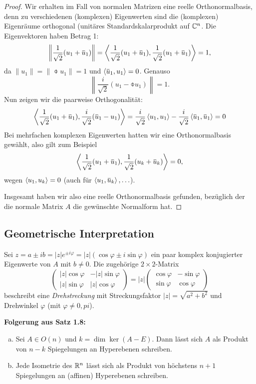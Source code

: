 \begin{proof}
 Wir erhalten im Fall von normalen Matrizen eine reelle Orthonormalbasis, denn zu verschiedenen (komplexen) Eigenwerten sind die (komplexen) Eigenräume orthogonal (uni\-täres Standardskalarprodukt auf $\mathbb{C}^n$. Die Eigenvektoren haben Betrag 1:
 \[ \left\| \rez{\sqrt{2}} ( u_1 + \obar{u}_1 ) \right\| = \scalar{\rez{\sqrt{2}} ( u_1 + \obar{u}_1 ), \rez{\sqrt{2}} ( u_1 + \obar{u}_1 )} = 1, \]
 da $\| u_1 \| = \| \obar{u}_1 \| = 1$ und $\scalar{\obar{u}_1, u_1} = 0$. Genauso
 \[ \left\| \frac{i}{\sqrt{2}} ( u_1 - \obar{u}_1 ) \right\| = 1. \]
 Nun zeigen wir die paarweise Orthogonalität:
 \[ \scalar{\rez{\sqrt{2}} (u_1 + \obar{u}_1), \frac{i}{\sqrt{2}} (\obar{u}_1 - u_1)} = \frac{i}{\sqrt{2}} \scalar{u_1, u_1} - \frac{i}{\sqrt{2}} \scalar{\obar{u}_1, \obar{u}_1} = 0 \]
 Bei mehrfachen komplexen Eigenwerten hatten wir eine Orthonormalbasis gewählt, also gilt zum Beispiel
 \[ \scalar{\rez{\sqrt{2}} ( u_1 + \obar{u}_1 ), \rez{\sqrt{2}} ( u_k + \obar{u}_k )} = 0, \]
 wegen $\left\langle u_1, u_k \right\rangle = 0$ (auch für $\scalar{u_1, \obar{u}_k}, \ldots$).
 
 Insgesamt haben wir also eine reelle Orthonormalbasis gefunden, bezüglich der die normale Matrix $A$ die gewünschte Normalform hat.
\end{proof}

\subsection{Geometrische Interpretation}
Sei $z = a \pm ib = |z| e^{\pm i \varphi} = |z| ( \cos \varphi \pm i \sin \varphi)$ ein paar komplex konjugierter Eigenwerte von $A$ mit $b \ne 0$. Die zugehörige $2 \times 2$-Matrix
\[ \begin{pmatrix} |z| \cos \varphi & - |z| \sin \varphi \\ |z| \sin \varphi & |z| \cos \varphi \end{pmatrix}
   = |z| \begin{pmatrix} \cos \varphi & - \sin \varphi \\ \sin \varphi & \cos \varphi \end{pmatrix} \]
beschreibt eine \emph{Drehstreckung} mit Streckungsfaktor $|z| = \sqrt{a^2 + b^2}$ und Drehwinkel $\varphi$ (mit $\varphi \ne 0, pi$).

\textbf{Folgerung aus Satz 1.8:}
\begin{thm}{}
 \begin{enumerate}[a)]
  \item Sei $A \in O(n)$ und $k = \dim \ker(A-E)$. Dann lässt sich $A$ als Produkt von $n-k$ Spiegelungen an Hyperebenen schreiben.
  \item Jede Isometrie des $\mathbb{R}^n$ lässt sich als Produkt von höchstens $n+1$ Spiegelungen an (affinen) Hyperebenen schreiben.
 \end{enumerate}
\end{thm}


